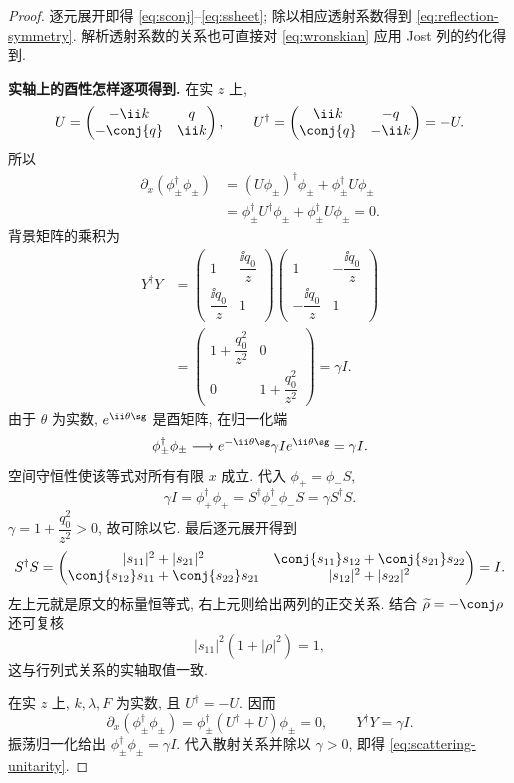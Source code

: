 \begin{proof}
逐元展开即得 \eqref{eq:sconj}--\eqref{eq:ssheet}; 除以相应透射系数得到 \eqref{eq:reflection-symmetry}. 解析透射系数的关系也可直接对 \eqref{eq:wronskian} 应用 Jost 列的约化得到.


\par\medskip\noindent\textbf{实轴上的酉性怎样逐项得到.}\quad 
在实 $z$ 上,
\[
U=\begin{pmatrix}-\ii k&q\\-\conj{q}&\ii k\end{pmatrix},
\qquad
U^\dagger=\begin{pmatrix}\ii k&-q\\\conj{q}&-\ii k\end{pmatrix}=-U.
\]
所以
\begin{align*}
\partial_x(\phi_\pm^\dagger\phi_\pm)
&=(U\phi_\pm)^\dagger\phi_\pm
+\phi_\pm^\dagger U\phi_\pm\\
&=\phi_\pm^\dagger U^\dagger\phi_\pm
+\phi_\pm^\dagger U\phi_\pm=0.
\end{align*}
背景矩阵的乘积为
\begin{align*}
Y^\dagger Y
&=\begin{pmatrix}1&\dfrac{\ii q_0}{z}\\
\dfrac{\ii q_0}{z}&1\end{pmatrix}
\begin{pmatrix}1&-\dfrac{\ii q_0}{z}\\
-\dfrac{\ii q_0}{z}&1\end{pmatrix}\\
&=\begin{pmatrix}1+\dfrac{q_0^2}{z^2}&0\\
0&1+\dfrac{q_0^2}{z^2}\end{pmatrix}=\gamma I.
\end{align*}
由于 $\theta$ 为实数, $e^{\ii\theta\sg}$ 是酉矩阵,
在归一化端
\[
\phi_\pm^\dagger\phi_\pm
\longrightarrow e^{-\ii\theta\sg}\gamma I e^{\ii\theta\sg}=\gamma I.
\]
空间守恒性使该等式对所有有限 $x$ 成立.
代入 $\phi_+=\phi_-S$,
\[
\gamma I=\phi_+^\dagger\phi_+
=S^\dagger\phi_-^\dagger\phi_-S
=\gamma S^\dagger S.
\]
$\gamma=1+\dfrac{q_0^2}{z^2}>0$, 故可除以它.
最后逐元展开得到
\[
S^\dagger S
=\begin{pmatrix}
|s_{11}|^2+|s_{21}|^2&\conj{s_{11}}s_{12}+\conj{s_{21}}s_{22}\\
\conj{s_{12}}s_{11}+\conj{s_{22}}s_{21}&|s_{12}|^2+|s_{22}|^2
\end{pmatrix}=I.
\]
左上元就是原文的标量恒等式, 右上元则给出两列的正交关系.
结合 $\widetilde\rho=-\conj\rho$ 还可复核
\[
|s_{11}|^2(1+|\rho|^2)=1,
\]
这与行列式关系的实轴取值一致.

在实 $z$ 上, $k,\lambda,F$ 为实数, 且 $U^\dagger=-U$. 因而
\[
\partial_x(\phi_\pm^\dagger\phi_\pm)
=\phi_\pm^\dagger(U^\dagger+U)\phi_\pm=0,\qquad
Y^\dagger Y=\gamma I.
\]
振荡归一化给出 $\phi_\pm^\dagger\phi_\pm=\gamma I$. 代入散射关系并除以 $\gamma>0$, 即得 \eqref{eq:scattering-unitarity}.
\end{proof}
